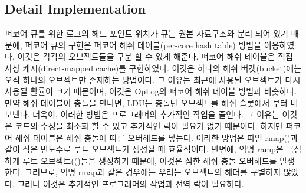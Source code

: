 \subsection{Detail Implementation}
퍼코어 큐를 위한 로그의 헤드 포인트 위치가 큐는 원본 자료구조와 분리 되어 있기 때문에, 
퍼코어 큐의 구현은 퍼코어 해쉬 테이블(per-core hash table) 방법을 이용하였다. 이것은
각각의 오브젝트들을 구분 할 수 있게 해준다.
퍼코어 해쉬 테이블은 직접 사상 캐시(direct-mapped cache)를 구현하였다. 이것은 하나의
 해쉬 버켓(bucket)에는 오직 하나의 오브젝트만 존재하는 방법이다.
그 이유는 최근에 사용된 오브젝트가 다시 사용될 활률이 크기 때문이며, 이것은 OpLog의 
퍼코어 해쉬 테이블 방법과 비슷하다.
만약 해쉬 테이블이 충돌을 만나면, LDU는 충돌난 오브젝트를 해쉬 슬롯에서 부터 내보낸다.
더욱이, 이러한 방법은 프로그래머의 추가적인 작업을 줄인다. 
그 이유는 이것은 코드의 수정을 최소화 할 수 있고 추가적인 락이 필요가 없기 때문이다.
하지만 퍼코어 해쉬 테이블은 해쉬 충돌에 따른 오버헤드를 낳는다.
이러한 방법은 파일 rmap()과 같이
 작은 빈도수로 루트 오브젝트가 생성될 때 효율적이다. 
반면에, 익명 ramp은 극심하게 루트 오브젝트(()들을 생성하기 때문에, 
이것은 심한 해쉬 충돌 오버헤드를 발생한다. 
그러므로, 익명 rmap과 같은 경우에는 우리는 오브젝트의 헤더를 구별하지 않았다. 
그러나 이것은 추가적인 프로그래머의 작업과 전역 락이 필요하다.



